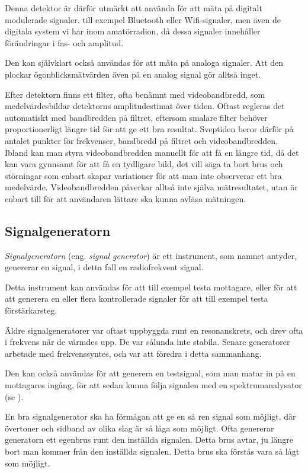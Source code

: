 Denna detektor är därför utmärkt att använda för att mäta på digitalt
modulerade signaler. till exempel Bluetooth eller Wifi-signaler, men även de digitala
system vi har inom amatörradion, då dessa signaler innehåller förändringar i
fas- och amplitud.

Den kan självklart också användas för att mäta på analoga signaler.
Att den plockar ögonblicksmätvärden även på en analog signal gör alltså inget.

Efter detektorn finns ett filter, ofta benämnt med videobandbredd, som
medelvärdesbildar detektorns amplitudestimat över tiden.
Oftast regleras det automatiskt med bandbredden på filtret, eftersom smalare
filter behöver proportionerligt längre tid för att ge ett bra resultat.
Sveptiden beror därför på antalet punkter för frekvenser, bandbredd på filtret
och videobandbredden.
Ibland kan man styra videobandbredden manuellt för att få en längre tid, då
det kan vara gynnsamt för att få en tydligare bild, det vill säga ta bort brus
och störningar som enbart skapar variationer för att man inte observerar ett bra
medelvärde.
Videobandbredden påverkar alltså inte själva mätresultatet, utan är enbart till
för att användaren lättare ska kunna avläsa mätningen.

\subsection{Signalgeneratorn}

\emph{Signalgeneratorn} (eng. \emph{signal generator}) är ett instrument, som
namnet antyder, genererar en signal, i detta fall en radiofrekvent signal.

Detta instrument kan användas för att till exempel testa mottagare, eller för att att
generera en eller flera kontrollerade signaler för att till exempel testa
förstärkarsteg.

Äldre signalgeneratorer var oftast uppbyggda runt en resonanskrets, och drev
ofta i frekvens när de värmdes upp.
De var sålunda inte stabila.
Senare generatorer arbetade med frekvenssyntes, och var att föredra i detta
sammanhang.

Den kan också användas för att generera en testsignal, som man matar in på en
mottagares ingång, för att sedan kunna följa signalen med en spektrumanalysator
(se ).

En bra signalgenerator ska ha förmågan att ge en så ren signal som möjligt,
där övertoner och sidband av olika slag är så låga som möjligt.
Ofta genererar generatorn ett egenbrus runt den inställda signalen.
Detta brus avtar, ju längre bort man kommer från den inställda signalen.
Detta brus ska förstås vara så lågt som möjligt.

